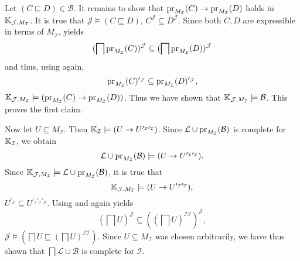 \begin{Proof}
  Let $(C \sqsubseteq D) \in \mathcal{B}$.  It remains to show that
  $\operatorname{pr}_{M_{\mathcal{I}}}(C) \to \operatorname{pr}_{M_{\mathcal{I}}}(D)$ holds in ${\mathbb{K}}_{\mathcal{J},
    M_{\mathcal{I}}}$.  It is true that $\mathcal{J} \models (C \sqsubseteq D)$, \ie
  $C^{\mathcal{J}} \subseteq D^{\mathcal{J}}$.  Since both $C, D$ are expressible in terms
  of $M_{\mathcal{I}}$,  yields
  \begin{equation*}
    (\bigsqcap \operatorname{pr}_{M_{\mathcal{I}}}(C))^{\mathcal{J}} \subseteq (\bigsqcap
    \operatorname{pr}_{M_{\mathcal{I}}}(D))^{\mathcal{J}}
  \end{equation*}
  and thus, using  again,
  \begin{equation*}
    \operatorname{pr}_{M_{\mathcal{I}}}(C)^{\prime_{\mathcal{J}}} \subseteq \operatorname{pr}_{M_{\mathcal{I}}}(D)^{\prime_\mathcal{J}},
  \end{equation*}
  \ie ${\mathbb{K}}_{\mathcal{J}, M_{\mathcal{I}}} \models (\operatorname{pr}_{M_{\mathcal{I}}}(C) \to
  \operatorname{pr}_{M_{\mathcal{I}}}(D))$.  Thus we have shown that ${\mathbb{K}}_{\mathcal{J},
    M_{\mathcal{I}}} \models \mathcal{B}$.  This proves the first claim.

  Now let $U \subseteq M_{\mathcal{I}}$.  Then ${\mathbb{K}}_{\mathcal{I}} \models (U \to
  U^{\prime_{\mathcal{I}}\prime_{\mathcal{I}}})$.  Since $\mathcal{L} \cup
  \operatorname{pr}_{M_{\mathcal{I}}}(\mathcal{B})$ is complete for ${\mathbb{K}}_{\mathcal{I}}$, we obtain
  \begin{equation*}
    \mathcal{L} \cup \operatorname{pr}_{M_{\mathcal{I}}}(\mathcal{B}) \models (U \to
    U^{\prime_{\mathcal{I}}\prime_{\mathcal{I}}}).
  \end{equation*}
  Since ${\mathbb{K}}_{\mathcal{J}, M_{\mathcal{I}}} \models \mathcal{L} \cup
  \operatorname{pr}_{M_{\mathcal{I}}}(\mathcal{B})$, it is true that
  \begin{equation*}
    {\ensuremath{\mathbb{K}}}_{\mathcal{J}, M_{\mathcal{I}}} \models (U \to U^{\prime_{\mathcal{I}}\prime_{\mathcal{I}}}),
  \end{equation*}
  \ie $U^{\prime_{\mathcal{J}}} \subseteq
  U^{\prime_{\mathcal{I}}\prime_{\mathcal{I}}\prime_{\mathcal{J}}}$.  Using 
  and  again yields
  \begin{equation*}
    (\bigsqcap U)^{\mathcal{J}} \subseteq ((\bigsqcap U)^{\mathcal{I}\mathcal{I}})^{\mathcal{J}},
  \end{equation*}
  \ie $\mathcal{J} \models (\bigsqcap U \sqsubseteq (\bigsqcap
  U)^{\mathcal{I}\mathcal{I}})$.  Since $U \subseteq M_{\mathcal{I}}$ was chosen
  arbitrarily, we have thus shown that $\bigsqcap \mathcal{L} \cup \mathcal{B}$ is
  complete for $\mathcal{I}$.
\end{Proof}

